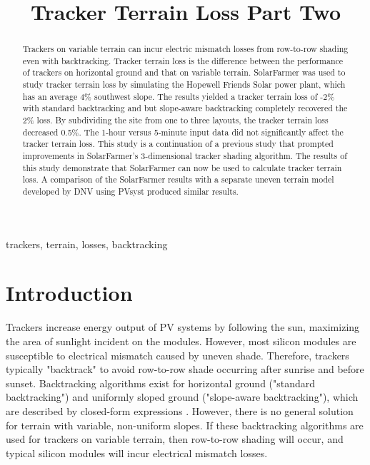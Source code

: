\documentclass[conference]{IEEEtran}
\begin{document}
\title{Tracker Terrain Loss Part Two}

\author{
	}

\maketitle

\begin{abstract}
Trackers on variable terrain can incur electric mismatch losses from row-to-row shading even with backtracking. Tracker terrain loss is the difference between the performance of trackers on horizontal ground and that on variable terrain. SolarFarmer was used to study tracker terrain loss by simulating the Hopewell Friends Solar power plant, which has an average 4\% southwest slope. The results yielded a tracker terrain loss of -2\% with standard backtracking and but slope-aware backtracking completely recovered the 2\% loss. By subdividing the site from one to three layouts, the tracker terrain loss decreased 0.5\%. The 1-hour versus 5-minute input data did not significantly affect the tracker terrain loss. This study is a continuation of a previous study that prompted improvements in SolarFarmer's 3-dimensional tracker shading algorithm. The results of this study demonstrate that SolarFarmer can now be used to calculate tracker terrain loss. A comparison of the SolarFarmer results with a separate uneven terrain model developed by DNV using PVsyst produced similar results.
\end{abstract}

\begin{IEEEkeywords}
trackers, terrain, losses, backtracking
\end{IEEEkeywords}

\section{Introduction}
Trackers increase energy output of PV systems by following the sun, maximizing the area of sunlight incident on the modules. However, most silicon modules are susceptible to electrical mismatch caused by uneven shade. Therefore, trackers typically "backtrack" to avoid  row-to-row shade occurring after sunrise and before sunset. Backtracking algorithms exist for horizontal ground ("standard backtracking") and uniformly sloped ground ("slope-aware backtracking"), which are described by closed-form expressions \cite{Marion2013,Anderson2020}. However, there is no general solution for terrain with variable, non-uniform slopes. If these backtracking algorithms are used for trackers on variable terrain, then row-to-row shading will occur, and typical silicon modules will incur electrical mismatch losses. 
\end{document}
